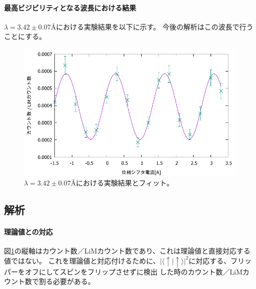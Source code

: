 \paragraph{最高ビジビリティとなる波長における結果}
$\lambda=3.42\pm0.07$Åにおける実験結果を以下に示す。
今後の解析はこの波長で行うことにする。
\begin{figure}[H]
\centering
\includegraphics{phase_shifter/fit.pdf}
\caption{$\lambda=3.42\pm0.07$Åにおける実験結果とフィット。\label{ps_fitresult}}
\end{figure}

\subsection{解析}
\paragraph{理論値との対応}
図\ref{ps_fitresult}の縦軸はカウント数／LiMカウント数であり、これは理論値と直接対応する値ではない。
これを理論値と対応付けるために、$|\langle\uparrow|\uparrow\rangle|^2$に対応する、フリッパーをオフにしてスピンをフリップさせずに検出
した時のカウント数／LiMカウント数で割る必要がある。


